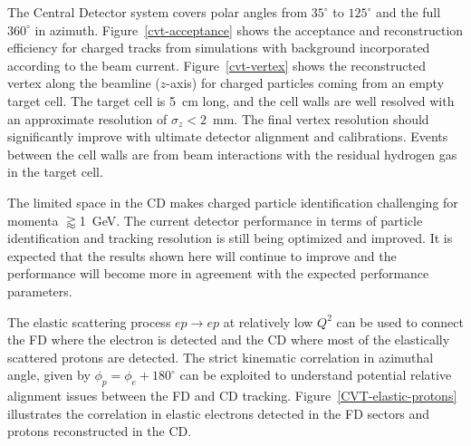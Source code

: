 \documentclass[final,3p,twocolumn]{elsarticle}
\begin{document}
The Central Detector system covers polar angles from $35^\circ$ to $125^\circ$ and the full $360^\circ$ in azimuth.
Figure~\ref{cvt-acceptance} shows the acceptance and reconstruction efficiency for charged tracks from
simulations with background incorporated according to the beam current. Figure~\ref{cvt-vertex}  shows the
reconstructed vertex along the beamline ($z$-axis) for charged particles coming from an empty target cell. The
target cell is 5~cm long, and the cell walls are well resolved with an approximate resolution of $\sigma_z<2$~mm.
The final vertex resolution should significantly improve with ultimate detector alignment and calibrations. Events
between the cell walls are from beam interactions with the residual hydrogen gas in the target cell.  

The limited space in the CD makes charged particle identification challenging for momenta $\gtrapprox$1~GeV.
The current detector performance in terms of particle identification and tracking resolution is still being optimized
and improved. It is expected that the results shown here will continue to improve and the performance will become
more in agreement with the expected performance parameters.

The elastic scattering process $ep \to ep$ at relatively low $Q^2$ can be used to connect the FD where the electron
is detected and the CD where most of the elastically scattered protons are detected. The strict kinematic correlation
in azimuthal angle, given by  $\phi_p = \phi_e + 180^\circ$  can be exploited to understand potential relative alignment
issues between the FD and CD tracking. Figure~\ref{CVT-elastic-protons} illustrates the correlation in elastic
electrons detected in the FD sectors and protons reconstructed in the CD. 
\end{document}
